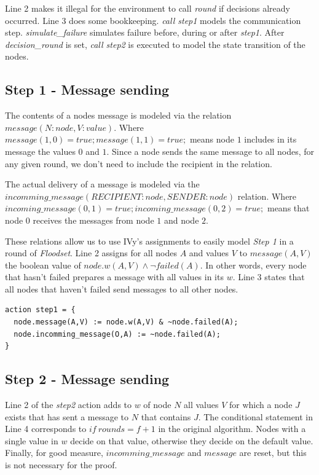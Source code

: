 \documentclass[fleqn]{article}
\begin{document}
\noindent Line 2 makes it illegal for the environment to call \textit{round} if decisions already occurred.
\noindent Line 3 does some bookkeeping.
\textit{call step1} models the communication step. \textit{simulate\_failure} simulates failure before, during
or after \textit{step1}. After \textit{decision\_round} is set, \textit{call step2} is
executed to model the state transition of the nodes.


\subsection{Step 1 - Message sending}
The contents of a nodes message is modeled via the relation $message(N:node,V:value)$. Where
$message(1,0) = true; message(1,1) = true;$ means node $1$ includes in its message the values $0$ and $1$.
Since a node sends the same message to all nodes, for any given round, we don't need to include the
recipient in the relation.

The actual delivery of a message is modeled via the $incomming\_message(RECIPIENT:node,SENDER:node)$ relation. Where $incoming\_message(0,1) = true; incoming\_message(0,2) = true;$ means that node $0$ receives the messages from node $1$ and node $2$.

These relations allow us to use IVy's assignments to easily model \textit{Step 1} in a round of \textit{Floodset}.
Line 2 assigns for all nodes $A$ and values $V$ to $message(A,V)$ the boolean value of $node.w(A,V) \land \neg failed(A)$. In other words, every node that hasn't failed prepares a message with all values in its $w$. Line 3 states that all nodes that haven't failed send messages to all other nodes.

\begin{mdframed}[backgroundcolor=light-gray, roundcorner=10pt,leftmargin=1, rightmargin=1, innerleftmargin=15, innertopmargin=15,innerbottommargin=15, outerlinewidth=1, linecolor=light-gray]
\begin{lstlisting}
action step1 = {
  node.message(A,V) := node.w(A,V) & ~node.failed(A);
  node.incomming_message(O,A) := ~node.failed(A);
}
\end{lstlisting}
\end{mdframed}

\subsection{Step 2 - Message sending}

Line 2 of the \textit{step2} action adds to $w$ of node $N$ all values $V$ for which a node $J$ exists that has sent a message to $N$ that contains $J$.
The conditional statement in Line 4 corresponds to $if\ rounds = f+1$ in the original algorithm. Nodes with a single value in $w$ decide on that value, otherwise
they decide on the default value.
Finally, for good measure, $incomming\_message$ and $message$ are reset, but this is not necessary for the proof.
\end{document}
